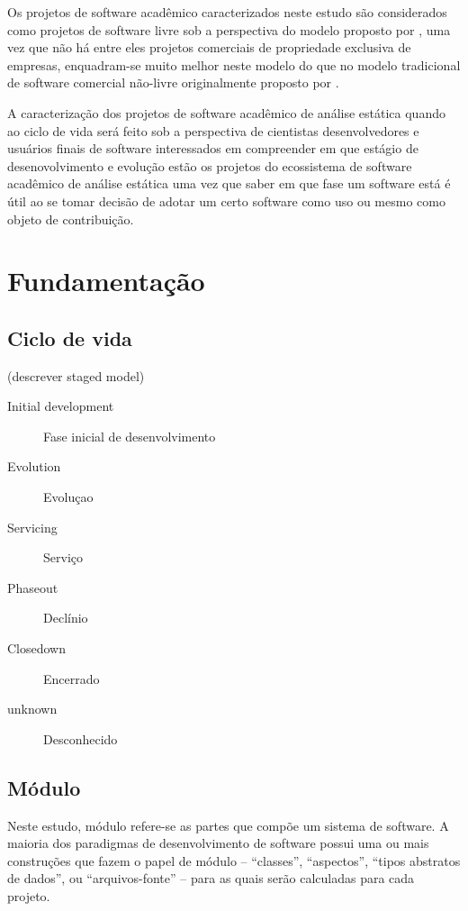 Os projetos de software acadêmico caracterizados neste estudo são considerados
como projetos de software livre sob a perspectiva do modelo proposto por
, uma vez que não há entre eles projetos
comerciais de propriedade exclusiva de empresas, enquadram-se muito melhor
neste modelo do que no modelo tradicional de software comercial não-livre
originalmente proposto por .

A caracterização dos projetos de software acadêmico de análise estática quando
ao ciclo de vida será feito sob a perspectiva de cientistas desenvolvedores e
usuários finais de software interessados em compreender em que estágio de
desenovolvimento e evolução estão os projetos do ecossistema de software
acadêmico de análise estática uma vez que saber em que fase um software está é
útil ao se tomar decisão de adotar um certo software como uso ou mesmo como
objeto de contribuição.

\section{Fundamentação} \label{estudo3:fundamentacao}

\subsection{Ciclo de vida}

(descrever staged model)

\begin{description}
  \item [Initial development] Fase inicial de desenvolvimento
  \item [Evolution] Evoluçao
  \item [Servicing] Serviço
  \item [Phaseout] Declínio
  \item [Closedown] Encerrado
  \item [unknown] Desconhecido
\end{description}

\subsection{Módulo}

Neste estudo, módulo refere-se as partes que compõe um sistema de software.  A
maioria dos paradigmas de desenvolvimento de software possui uma ou mais
construções que fazem o papel de módulo -- ``classes'', ``aspectos'', ``tipos
abstratos de dados'', ou ``arquivos-fonte'' -- para as quais serão calculadas
para cada projeto.

